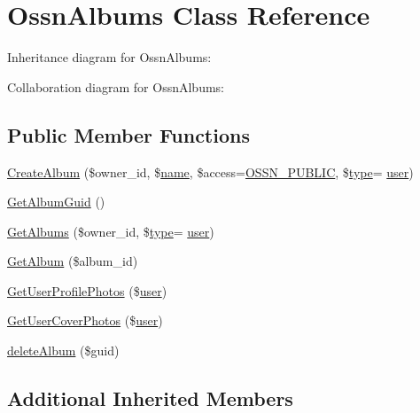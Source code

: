 \hypertarget{class_ossn_albums}{}\section{Ossn\+Albums Class Reference}
\label{class_ossn_albums}


Inheritance diagram for Ossn\+Albums\+:


Collaboration diagram for Ossn\+Albums\+:
\subsection*{Public Member Functions}
\begin{DoxyCompactItemize}
\item 
\hyperlink{class_ossn_albums_afa0bc70d29c5d79bf71ea6ac069df120}{Create\+Album} (\$owner\+\_\+id, \$\hyperlink{user_8php_a765af5e9671743530143a6d3670fd9a6}{name}, \$access=\hyperlink{ossn_8lib_8system_8php_a8efdc824fa9025d0c02ee7c512aafdfa}{O\+S\+S\+N\+\_\+\+P\+U\+B\+L\+IC}, \$\hyperlink{_ossn_wall_2actions_2wall_2post_2group_8php_a2dc1bb4e1ed0029daa81ac0776b14b51}{type}= \textquotesingle{}\hyperlink{ossn_8config_8db_8example_8php_a802544b7ba9f79bbf24ef67773d53bed}{user}\textquotesingle{})
\item 
\hyperlink{class_ossn_albums_a9b49283cfc1bca4e35c86769d28205af}{Get\+Album\+Guid} ()
\item 
\hyperlink{class_ossn_albums_a0f8feac9097ce1b4449616cc34742a4f}{Get\+Albums} (\$owner\+\_\+id, \$\hyperlink{_ossn_wall_2actions_2wall_2post_2group_8php_a2dc1bb4e1ed0029daa81ac0776b14b51}{type}= \textquotesingle{}\hyperlink{ossn_8config_8db_8example_8php_a802544b7ba9f79bbf24ef67773d53bed}{user}\textquotesingle{})
\item 
\hyperlink{class_ossn_albums_a2d68fc2249acdbe0606a6a641851bca2}{Get\+Album} (\$album\+\_\+id)
\item 
\hyperlink{class_ossn_albums_afa526bcdc64e4dc6d51a7f97bc900e04}{Get\+User\+Profile\+Photos} (\$\hyperlink{ossn_8config_8db_8example_8php_a802544b7ba9f79bbf24ef67773d53bed}{user})
\item 
\hyperlink{class_ossn_albums_a2f2d2cca8f5b8762c0cefe4cf756e78d}{Get\+User\+Cover\+Photos} (\$\hyperlink{ossn_8config_8db_8example_8php_a802544b7ba9f79bbf24ef67773d53bed}{user})
\item 
\hyperlink{class_ossn_albums_a69f6eeb9c51593a11a7236a4d9023743}{delete\+Album} (\$guid)
\end{DoxyCompactItemize}
\subsection*{Additional Inherited Members}


